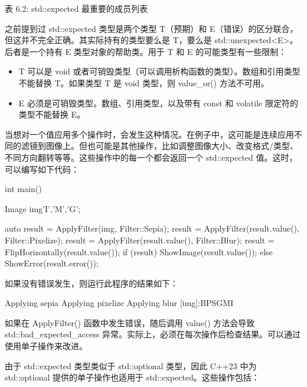 \begin{center}
表 6.2: std::expected 最重要的成员列表
\end{center}

之前提到过 std::expected 类型是两个类型 T（预期）和 E（错误）的区分联合，但这并不完全正确。其实际持有的类型要么是 T，要么是 std::unexpected<E>。后者是一个持有 E 类型对象的帮助类。用于 T 和 E 的可能类型有一些限制：

\begin{itemize}
\item
T 可以是 void 或者可销毁类型（可以调用析构函数的类型）。数组和引用类型不能替换 T。如果类型 T 是 void 类型，则 value\_or() 方法不可用。

\item
E 必须是可销毁类型。数组、引用类型，以及带有 const 和 volatile 限定符的类型不能替换 E。
\end{itemize}

当想对一个值应用多个操作时，会发生这种情况。在例子中，这可能是连续应用不同的滤镜到图像上。但也可能是其他操作，比如调整图像大小、改变格式/类型、不同方向翻转等等。这些操作中的每一个都会返回一个 std::expected 值。这时，可以编写如下代码：

\begin{cpp}
int main()
{
    Image img{'I','M','G'};

    auto result = ApplyFilter(img, Filter::Sepia);
    result = ApplyFilter(result.value(), Filter::Pixelize);
    result = ApplyFilter(result.value(), Filter::Blur);
    result = FlipHorizontally(result.value());
    if (result)
    {
        ShowImage(result.value());
    }
    else
    {
        ShowError(result.error());
    }
}
\end{cpp}

如果没有错误发生，则运行此程序的结果如下：

\begin{shell}
Applying sepia
Applying pixelize
Applying blur
[img]:BPSGMI
\end{shell}

如果在 ApplyFilter() 函数中发生错误，随后调用 value() 方法会导致 std::bad\_expected\_access 异常。实际上，必须在每次操作后检查结果。可以通过使用单子操作来改进。

由于 std::expected 类型类似于 std::optional 类型，因此 C++23 中为 std::optional 提供的单子操作也适用于 std::expected。这些操作包括：

